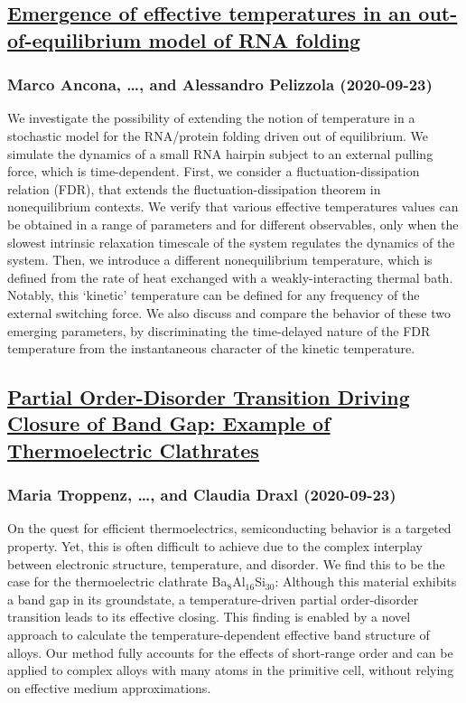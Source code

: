 \subsection*{\href{http://arxiv.org/abs/2009.11145v1}{Emergence of effective temperatures in an out-of-equilibrium model of  RNA folding}}
\subsubsection*{Marco Ancona, \dots, and Alessandro Pelizzola (2020-09-23)}
We investigate the possibility of extending the notion of temperature in a
stochastic model for the RNA/protein folding driven out of equilibrium. We
simulate the dynamics of a small RNA hairpin subject to an external pulling
force, which is time-dependent. First, we consider a fluctuation-dissipation
relation (FDR), that extends the fluctuation-dissipation theorem in
nonequilibrium contexts. We verify that various effective temperatures values
can be obtained in a range of parameters and for different observables, only
when the slowest intrinsic relaxation timescale of the system regulates the
dynamics of the system. Then, we introduce a different nonequilibrium
temperature, which is defined from the rate of heat exchanged with a
weakly-interacting thermal bath. Notably, this `kinetic' temperature can be
defined for any frequency of the external switching force. We also discuss and
compare the behavior of these two emerging parameters, by discriminating the
time-delayed nature of the FDR temperature from the instantaneous character of
the kinetic temperature.

\subsection*{\href{http://arxiv.org/abs/2009.11137v1}{Partial Order-Disorder Transition Driving Closure of Band Gap: Example  of Thermoelectric Clathrates}}
\subsubsection*{Maria Troppenz, \dots, and Claudia Draxl (2020-09-23)}
On the quest for efficient thermoelectrics, semiconducting behavior is a
targeted property. Yet, this is often difficult to achieve due to the complex
interplay between electronic structure, temperature, and disorder. We find this
to be the case for the thermoelectric clathrate Ba$_8$Al$_{16}$Si$_{30}$:
Although this material exhibits a band gap in its groundstate, a
temperature-driven partial order-disorder transition leads to its effective
closing. This finding is enabled by a novel approach to calculate the
temperature-dependent effective band structure of alloys. Our method fully
accounts for the effects of short-range order and can be applied to complex
alloys with many atoms in the primitive cell, without relying on effective
medium approximations.

